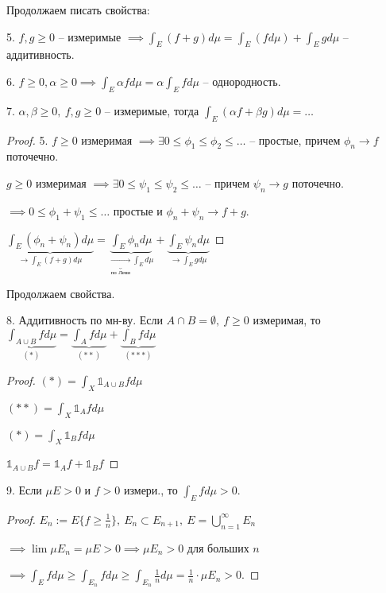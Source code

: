\begin{properties}
    Продолжаем писать свойства:

    5. $f, g \geq 0$ -- измеримые $\implies \int_E{(f+g) d \mu} = \int_E(f d \mu) + \int_E{g d \mu}$ -- аддитивность.

    6. $f \geq 0, \alpha \geq 0 \implies \int_E{\alpha f d \mu} = \alpha \int_E{f d \mu}$ -- однородность.

    7. $\alpha, \beta \geq 0, \ f, g \geq 0$ -- измеримые, тогда $\int_E{(\alpha f + \beta g) d \mu} = \dots$
\end{properties}

\begin{proof}
    5. $f \geq 0$ измеримая $\implies \exists 0 \leq \phi_1 \leq \phi_2 \leq \dots$ -- простые, причем $\phi_n \rightarrow f$ поточечно.
    
    $g \geq 0$ измеримая $\implies \exists 0 \leq \psi_1 \leq \psi_2 \leq \dots$ -- причем $\psi_n \rightarrow g$ поточечно.

    $\implies 0 \leq \phi_1 + \psi_1 \leq \dots$ простые и $\phi_n + \psi_n \rightarrow f + g$.


    $\underbrace{\int_E{(\phi_n + \psi_n) d \mu}}_{\rightarrow \int_E{(f+g) d \mu}} = \underbrace{\int_E{\phi_n d \mu}}_{\underbrace{\rightarrow}_{\text{по Леви}} \int_E d \mu} + \underbrace{\int_E{\psi_n d \mu}}_{\rightarrow \int_E{g d \mu}}$
\end{proof}

\begin{properties}
    Продолжаем свойства.

    8. Аддитивность по мн-ву. Если $A \cap B = \emptyset, \ f \geq 0$ измеримая, то 
    $\underbrace{\int_{A\cup B}{f d \mu}}_{(*)} = \underbrace{\int_A{f d \mu}}_{(**)} + \underbrace{\int_B{f d \mu}}_{(***)}$

    \begin{proof}
        $(*) = \int_X{\mathbb{1}_{A \cup B} f d \mu}$

        $(**) = \int_X{\mathbb{1}_{A} f d \mu}$

        $(*) = \int_X{\mathbb{1}_{B} f d \mu}$

        $\mathbb{1}_{A \cup B} f = \mathbb{1}_A f + \mathbb{1}_B f$
    \end{proof}

    9. Если $\mu E > 0$ и $f > 0$ измери., то $\int_E{f d \mu} > 0$.

    \begin{proof}
        $E_n := E \{ f \geq \frac{1}{n} \}, \ E_n \subset E_{n+1}, \ E = \bigcup_{n=1}^{\infty} E_n$

        $\implies \lim{\mu E_n} = \mu E > 0 \implies \mu E_n > 0$ для больших $n$

        $\implies \int_E{f d \mu} \geq \int_{E_n} f d \mu \geq \int_{E_n} {\frac{1}{n} d \mu} = \frac{1}{n} \cdot \mu E_n > 0$.
    \end{proof}
\end{properties}

